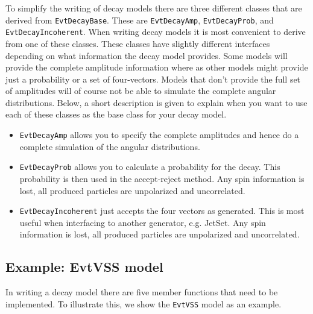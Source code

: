 To simplify the writing of decay models there are three different classes that
are derived from {\tt EvtDecayBase}. These are {\tt EvtDecayAmp},
{\tt EvtDecayProb}, and {\tt EvtDecayIncoherent}. When
writing decay models it is most convenient to derive from one of
these classes. These classes have slightly different interfaces depending
on what information the decay model provides. Some models will provide the 
complete amplitude information where as other models might provide 
just a probability or a set of four-vectors. Models that 
don't provide the full set of amplitudes will of course not
be able to simulate the complete angular distributions. Below, a short
description is given to explain when you want to use each of these
classes as the base class for your decay model.
\begin{itemize}
\item {\tt EvtDecayAmp} allows you to specify the complete amplitudes
      and hence do a complete simulation of the angular distributions. 
\item {\tt EvtDecayProb} allows you to calculate a probability for
      the decay. This probability is then used in the accept-reject method.
      Any spin information is lost, all produced particles are unpolarized
      and uncorrelated.
\item {\tt EvtDecayIncoherent} just accepts the four vectors as
      generated. This is most useful when interfacing to another 
      generator, e.g. JetSet.
      Any spin information is lost, all produced particles are unpolarized
      and uncorrelated.

\end{itemize}

\subsection{Example: EvtVSS model}
In writing a decay model there are five member functions that
need to be implemented.  To illustrate this, we show the
{\tt EvtVSS} model as an example.  

